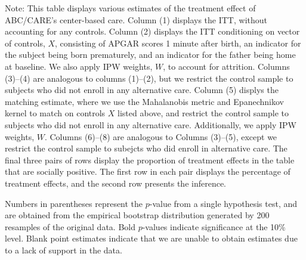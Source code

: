 \begin{table}[H]
\begin{threeparttable}
\begin{tabular}{cccccccccc}
  \hline\hline
  \end{tabular}
    \begin{tablenotes}
    \scriptsize
    \item 
Note: This table displays various estimates of the treatment effect of ABC/CARE's center-based care.
Column (1) displays the ITT, without accounting for any controls.
Column (2) displays the ITT conditioning on vector of controls, $X$, consisting of APGAR scores 1 
minute after birth, an indicator for the subject being born prematurely, and an indicator for the 
father being home at baseline. We also apply IPW weights, $W$, to account for attrition.
Columns (3)--(4) are analogous to columns (1)--(2), but we restrict the control sample to subjects
who did not enroll in any alternative care.
Column (5) displys the matching estimate, where we use the Mahalanobis metric and Epanechnikov kernel
to match on controls $X$ listed above, and restrict the control sample to subjects who did not enroll
in any alternative care. Additionally, we apply IPW weights, $W$.
Columns (6)--(8) are analogous to Columns (3)--(5), except we restrict the control sample to subejcts
who did enroll in alternative care. 
The final three pairs of rows display the proportion of treatment effects in the table that are 
socially positive. The first row in each pair displays the percentage of treatment effects, and the
second row presents the inference.

Numbers in parentheses represent the $p$-value from a single hypothesis test, and are obtained from 
the empirical bootstrap distribution generated by 200 resamples of the original data. 
Bold $p$-values indicate significance at the 10\% level.
Blank point estimates indicate that we are unable to obtain estimates due to a lack of support in the data. 

    \end{tablenotes}
  \end{threeparttable}

\end{table}